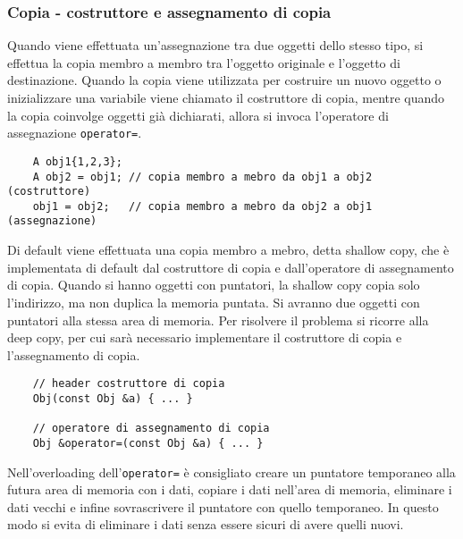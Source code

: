 \documentclass[a4paper]{article}
\begin{document}
\subsubsection*{Copia - costruttore e assegnamento di copia}
Quando viene effettuata un'assegnazione tra due oggetti dello stesso tipo, si effettua la copia membro a membro tra l'oggetto
originale e l'oggetto di destinazione. Quando la copia viene utilizzata per costruire un nuovo oggetto o inizializzare una
variabile viene chiamato il costruttore di copia, mentre quando la copia coinvolge oggetti già dichiarati, allora si invoca
l'operatore di assegnazione \verb|operator=|.
\begin{lstlisting}
	A obj1{1,2,3};
	A obj2 = obj1; // copia membro a mebro da obj1 a obj2 (costruttore)
	obj1 = obj2;   // copia membro a mebro da obj2 a obj1 (assegnazione)
\end{lstlisting}
Di default viene effettuata una copia membro a mebro, detta shallow copy, che è implementata di default dal costruttore di copia
e dall'operatore di assegnamento di copia. Quando si hanno oggetti con puntatori, la shallow copy copia solo l'indirizzo, ma non
duplica la memoria puntata. Si avranno due oggetti con puntatori alla stessa area di memoria. Per risolvere il problema si ricorre
alla deep copy, per cui sarà necessario implementare il costruttore di copia e l'assegnamento di copia.
\begin{lstlisting}
	// header costruttore di copia
	Obj(const Obj &a) { ... }

	// operatore di assegnamento di copia
	Obj &operator=(const Obj &a) { ... }
\end{lstlisting}
Nell'overloading dell'\verb|operator=| è consigliato creare un puntatore temporaneo alla futura area di memoria con i dati, copiare
i dati nell'area di memoria, eliminare i dati vecchi e infine sovrascrivere il puntatore con quello temporaneo. In questo modo si
evita di eliminare i dati senza essere sicuri di avere quelli nuovi.
\end{document}
